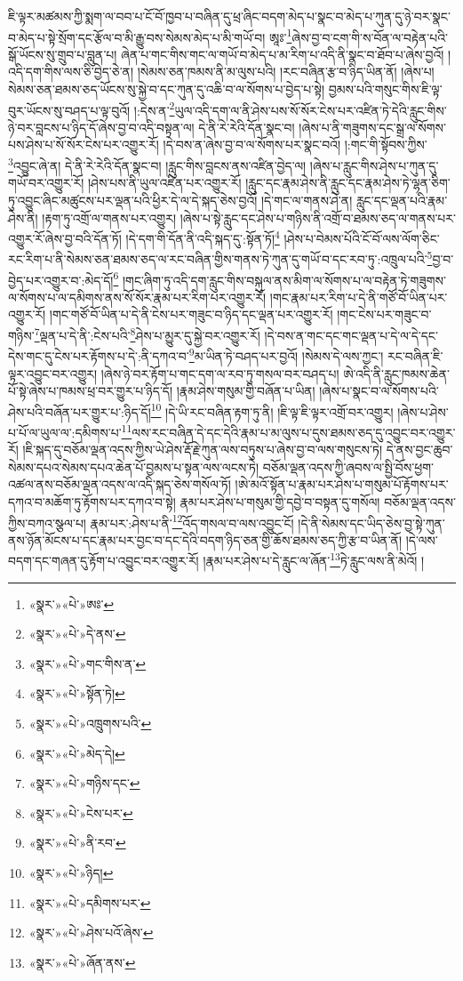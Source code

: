 ཇི་ལྟར་མཚམས་ཀྱི་སྨག་ལ་བབ་པ་ངོ་བོ་ཁྱབ་པ་བཞིན་དུ་ཕྲ་ཞིང་བདག་མེད་པ་སྣང་བ་མེད་པ་ཀུན་དུ་ཉེ་བར་སྣང་བ་མེད་པ་སྟེ་སྲོག་དང་རྩོལ་བ་མི་རྒྱུ་བས་སེམས་མེད་པ་མི་གཡོ་བ། ཨཱཿ་\footnote{«སྣར་»«པེ་»ཨཿ་}ཞེས་བྱ་བ་ངག་གི་ས་བོན་ལ་བརྟེན་པའི་སྒོ་ཡོངས་སུ་གྲུབ་པ་བླུན་པ། ཞེན་པ་གང་གིས་གང་ལ་གཡོ་བ་མེད་པ་མ་རིག་པ་འདི་ནི་སྣང་བ་ཐོབ་པ་ཞེས་བྱའོ། །འདི་དག་གིས་ལས་ཅི་བྱེད་ཅེ་ན། །སེམས་ཅན་ཁམས་ནི་མ་ལུས་པའི། །རང་བཞིན་རྩ་བ་ཉིད་ཡིན་ནོ། །ཞེས་པ། སེམས་ཅན་ཐམས་ཅད་ཡོངས་སུ་སྐྱེ་བ་དང་ཀུན་དུ་འཆི་བ་ལ་སོགས་པ་བྱེད་པ་སྟེ། བྱམས་པའི་གསུང་གིས་ཇི་ལྟ་བུར་ཡོངས་སུ་བཤད་པ་ལྟ་བུའོ། །:དེས་ན་\footnote{«སྣར་»«པེ་»དེ་ནས་}ཡུལ་འདི་དག་ལ་ནི་ཤེས་པས་སོ་སོར་ངེས་པར་འཛིན་ཏེ་དེའི་རླུང་གིས་ཉེ་བར་བླངས་པ་ཉིད་དོ་ཞེས་བྱ་བ་འདི་བསྟན་ལ། དེ་ནི་རེ་རེའི་དོན་སྣང་བ། །ཞེས་པ་ནི་གཟུགས་དང་སྒྲ་ལ་སོགས་པས་ཤེས་པ་སོ་སོར་ངེས་པར་འགྱུར་རོ། །དེ་བས་ན་ཞེས་བྱ་བ་ལ་སོགས་པར་སྣང་བའོ། །:གང་གི་སྟོབས་ཀྱིས་\footnote{«སྣར་»«པེ་»གང་གིས་ན་}འབྱུང་ཞེ་ན། དེ་ནི་རེ་རེའི་དོན་སྣང་བ། །རླུང་གིས་བླངས་ནས་འཛིན་བྱེད་ལ། །ཞེས་པ་རླུང་གིས་ཤེས་པ་ཀུན་དུ་གཡོ་བར་འགྱུར་རོ། །ཤེས་པས་ནི་ཡུལ་འཛིན་པར་འགྱུར་རོ། །རླུང་དང་རྣམ་ཤེས་ནི་རླུང་དང་རྣམ་ཤེས་ཏེ་ལྷན་ཅིག་ཏུ་འབྱུང་ཞིང་མཚུངས་པར་ལྡན་པའི་ཕྱིར་དེ་ལ་དེ་སྐད་ཅེས་བྱའོ། །དེ་གང་ལ་གནས་ཤེ་ན། རླུང་དང་ལྡན་པའི་རྣམ་ཤེས་ནི། །རྟག་ཏུ་འགྲོ་ལ་གནས་པར་འགྱུར། །ཞེས་པ་སྟེ་རླུང་དང་ཤེས་པ་གཉིས་ནི་འགྲོ་བ་ཐམས་ཅད་ལ་གནས་པར་འགྱུར་རོ་ཞེས་བྱ་བའི་དོན་ཏོ། །དེ་དག་གི་དོན་ནི་འདི་སྐད་དུ་:སྟོན་ཏོ།\footnote{«སྣར་»«པེ་»སྟོན་ཏེ།} །ཤེས་པ་བེམས་པོའི་ངོ་བོ་ལས་ལོག་ཅིང་རང་རིག་པ་ནི་སེམས་ཅན་ཐམས་ཅད་ལ་རང་བཞིན་གྱིས་གནས་ཏེ་ཀུན་དུ་གཡོ་བ་དང་རབ་ཏུ་:འཁྲུལ་པའི་\footnote{«སྣར་»«པེ་»འཁྲུགས་པའི་}བྱ་བ་བྱེད་པར་འགྱུར་བ་:མེད་དོ།\footnote{«སྣར་»«པེ་»མེད་དེ།} །གང་ཞིག་ཏུ་འདི་དག་རླུང་གིས་བསྐུལ་ནས་མིག་ལ་སོགས་པ་ལ་བརྟེན་ཏེ་གཟུགས་ལ་སོགས་པ་ལ་དམིགས་ནས་སོ་སོར་རྣམ་པར་རིག་པར་འགྱུར་རོ། །གང་རྣམ་པར་རིག་པ་དེ་ནི་གཙོ་བོ་ཡིན་པར་འགྱུར་རོ། །གང་གཙོ་བོ་ཡིན་པ་དེ་ནི་ངེས་པར་གཟུང་བ་ཉིད་དང་ལྡན་པར་འགྱུར་རོ། །གང་ངེས་པར་གཟུང་བ་གཉིས་\footnote{«སྣར་»«པེ་»གཉིས་དང་}ལྡན་པ་དེ་ནི་:ངེས་པའི་\footnote{«སྣར་»«པེ་»ངེས་པར་}ཤེས་པ་མྱུར་དུ་སྐྱེ་བར་འགྱུར་རོ། །དེ་བས་ན་གང་དང་གང་ལྡན་པ་དེ་ལ་དེ་དང་དེས་གང་དུ་ངེས་པར་རྟོགས་པ་དེ་:ནི་དཀའ་བ་\footnote{«སྣར་»«པེ་»ནི་རབ་}མ་ཡིན་ཏེ་བཤད་པར་བྱའོ། །སེམས་དེ་ལས་ཀྱང་། རང་བཞིན་ཇི་ལྟར་འབྱུང་བར་འགྱུར། །ཞེས་ཉེ་བར་རྟོག་པ་གང་དག་ལ་རབ་ཏུ་གསལ་བར་བཤད་པ། ཨེ་འདི་ནི་རླུང་ཁམས་ཆེན་པོ་སྟེ་ཞེས་པ་ཁམས་ཕྲ་བར་གྱུར་པ་ཉིད་དོ། །རྣམ་ཤེས་གསུམ་གྱི་བཞོན་པ་ཡིན། །ཞེས་པ་སྣང་བ་ལ་སོགས་པའི་ཤེས་པའི་བཞོན་པར་གྱུར་པ་:ཉིད་དོ།\footnote{«སྣར་»«པེ་»ཉིད།} །དེ་ཡི་རང་བཞིན་རྟག་ཏུ་ནི། །ཇི་ལྟ་ཇི་ལྟར་འགྲོ་བར་འགྱུར། །ཞེས་པ་ཤེས་པ་པོ་ལ་ཡུལ་ལ་:དམིགས་པ་\footnote{«སྣར་»«པེ་»དམིགས་པར་}ལས་རང་བཞིན་དེ་དང་དེའི་རྣམ་པ་མ་ལུས་པ་དུས་ཐམས་ཅད་དུ་འབྱུང་བར་འགྱུར་རོ། །ཇི་སྐད་དུ་བཅོམ་ལྡན་འདས་ཀྱིས་ཡེ་ཤེས་རྡོ་རྗེ་ཀུན་ལས་བཏུས་པ་ཞེས་བྱ་བ་ལས་གསུངས་ཏེ། དེ་ནས་བྱང་ཆུབ་སེམས་དཔའ་སེམས་དཔའ་ཆེན་པོ་བྱམས་པ་སྟན་ལས་ལངས་ཏེ། བཅོམ་ལྡན་འདས་ཀྱི་ཞབས་ལ་སྤྱི་བོས་ཕྱག་འཚལ་ནས་བཅོམ་ལྡན་འདས་ལ་འདི་སྐད་ཅེས་གསོལ་ཏོ། །ཨེ་མའོ་སྟོན་པ་རྣམ་པར་ཤེས་པ་གསུམ་པོ་རྟོགས་པར་དཀའ་བ་མཆོག་ཏུ་རྟོགས་པར་དཀའ་བ་སྟེ། རྣམ་པར་ཤེས་པ་གསུམ་གྱི་དབྱེ་བ་བསྟན་དུ་གསོལ། བཅོམ་ལྡན་འདས་ཀྱིས་བཀའ་སྩལ་པ། རྣམ་པར་:ཤེས་པ་ནི་\footnote{«སྣར་»«པེ་»ཤེས་པའོ་ཞེས་}འོད་གསལ་བ་ལས་འབྱུང་ངོ། །དེ་ནི་སེམས་དང་ཡིད་ཅེས་བྱ་སྟེ་ཀུན་ནས་ཉོན་མོངས་པ་དང་རྣམ་པར་བྱང་བ་དང་དེའི་བདག་ཉིད་ཅན་གྱི་ཆོས་ཐམས་ཅད་ཀྱི་རྩ་བ་ཡིན་ནོ། །དེ་ལས་བདག་དང་གཞན་དུ་རྟོག་པ་འབྱུང་བར་འགྱུར་རོ། །རྣམ་པར་ཤེས་པ་དེ་རླུང་ལ་ཞོན་\footnote{«སྣར་»«པེ་»ཞོན་ནས་}ཏེ་རླུང་ལས་ནི་མེའོ། །
